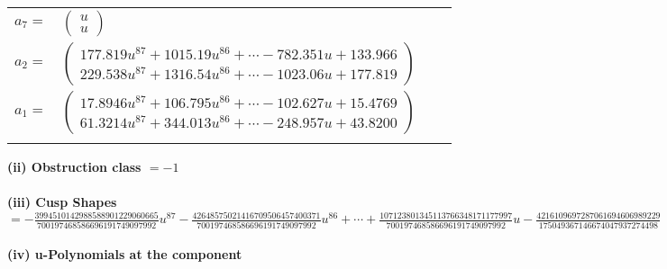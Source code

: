 \documentclass[1p]{elsarticle_modified}
\theoremstyle{definition}
\begin{document}
\begin{tabular}{m{7pt} m{180pt} m{7pt} m{180pt} }
\flushright $a_{7}=$&$\begin{pmatrix}u\\u\end{pmatrix}$ \\
\flushright $a_{2}=$&$\begin{pmatrix}177.819 u^{87}+1015.19 u^{86}+\cdots-782.351 u+133.966\\229.538 u^{87}+1316.54 u^{86}+\cdots-1023.06 u+177.819\end{pmatrix}$ \\
\flushright $a_{1}=$&$\begin{pmatrix}17.8946 u^{87}+106.795 u^{86}+\cdots-102.627 u+15.4769\\61.3214 u^{87}+344.013 u^{86}+\cdots-248.957 u+43.8200\end{pmatrix}$\\&\end{tabular}
\flushleft \textbf{(ii) Obstruction class $= -1$}\\~\\
\flushleft \textbf{(iii) Cusp Shapes $= -\frac{3994510142988588901229060665}{700197468586696191749097992} u^{87}-\frac{42648575021416709506457400371}{700197468586696191749097992} u^{86}+\cdots+\frac{107123801345113766348171177997}{700197468586696191749097992} u-\frac{4216109697287061694606989229}{175049367146674047937274498}$}\\~\\
\newpage\renewcommand{\arraystretch}{1}
\flushleft \textbf{(iv) u-Polynomials at the component}\newline \\
\end{document}
